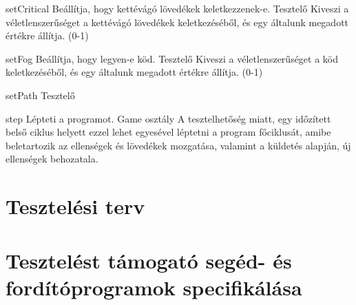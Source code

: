 \usecase
{setCritical}
{Beállítja, hogy kettévágó lövedékek keletkezzenek-e.}
{Tesztelő}
{Kiveszi a véletlenszerűséget a kettévágó lövedékek keletkezéséből, és egy általunk megadott értékre állítja. (0-1)}

\usecase
{setFog}
{Beállítja, hogy legyen-e köd.}
{Tesztelő}
{Kiveszi a véletlenszerűséget a köd keletkezéséből, és egy általunk megadott értékre állítja. (0-1)}

\usecase
{setPath}
{}
{Tesztelő}
{}

\usecase
{step}
{Lépteti a programot.}
{Game osztály}
{A tesztelhetőség miatt, egy időzített belső ciklus helyett ezzel lehet egyesével léptetni a program főciklusát,
 amibe beletartozik az ellenségek és lövedékek mozgatása, valamint a küldetés alapján, új ellenségek behozatala.}

\section{Tesztelési terv}


\section{Tesztelést támogató segéd- és fordítóprogramok specifikálása}

